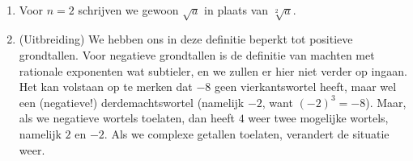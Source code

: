 \documentclass{ximera}
\begin{document}
\begin{remark} \ 
\begin{enumerate}
	\item Voor $n=2$ schrijven we gewoon $\sqrt{a}$ in plaats van $\sqrt[2]{a}$.
	\item (Uitbreiding) We hebben ons in deze definitie beperkt tot positieve grondtallen. Voor negatieve grondtallen is de definitie van machten met rationale exponenten wat subtieler, en we zullen er hier niet verder op ingaan. Het kan volstaan op te merken dat $-8$ geen vierkantswortel heeft, maar wel een (negatieve!) derdemachtswortel (namelijk $-2$, want $(-2)^3 = -8$). Maar, als we negatieve wortels toelaten, dan heeft $4$ weer twee mogelijke wortels, namelijk $2$ en $-2$. Als we complexe getallen toelaten, verandert de situatie weer. 
\end{enumerate}
\end{remark}
\end{document}
